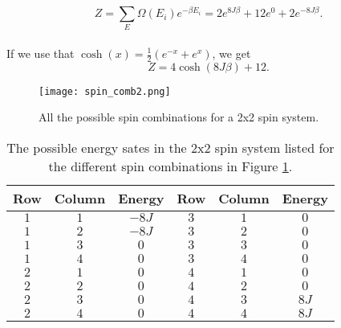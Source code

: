 \documentclass[12pt]{article}
\begin{document}
\begin{flushleft}
\vspace{5mm}
$$Z = \sum\limits_E \Omega(E_i)e^{-\beta E_i} = 2e^{8J\beta} + 12e^{0}+2e^{-8J\beta}.$$\\
\vspace{5mm}  
If we use that $\cosh(x) = \frac{1}{2}\left(e^{-x} + e^{x}\right)$, we get
\vspace{5mm}
\begin{equation}\label{eq:expr_Z}
Z = 4\cosh(8J\beta) + 12.
\end{equation}

\begin{figure}[!h]
\begin{center}
\texttt{[image: spin\_comb2.png]}
\caption{\label{fig:spin_comb}All the possible spin combinations for a 2x2 spin system.}
\end{center}
\end{figure}

\begin{table}[!h]
\begin{center}
\begin{tabular}{| c | c | c || c | c | c |}
	\hline
	\textbf{Row} & \textbf{Column} & \textbf{Energy} & \textbf{Row} & \textbf{Column} & \textbf{Energy}\\
	\hline	
	$1$ & $1$ & $-8J$ & $3$ & $1$ & $0$ \\
	$1$ & $2$ & $-8J$ & $3$ & $2$ & $0$ \\	
	$1$ & $3$ & $0$ & $3$ & $3$ & $0$ \\
	$1$ & $4$ & $0$ & $3$ & $4$ & $0$ \\
	$2$ & $1$ & $0$ & $4$ & $1$ & $0$ \\
	$2$ & $2$ & $0$ & $4$ & $2$ & $0$\\
	$2$ & $3$ & $0$ & $4$ & $3$ & $8J$\\
	$2$ & $4$ & $0$ & $4$ & $4$ & $8J$\\
  \hline
\end{tabular}
\end{center}
\caption{\label{tab:energy_states}The possible energy sates in the 2x2 spin system listed for the different spin combinations in Figure \ref{fig:spin_comb}.}
\end{table}
\newpage

\end{flushleft}
\end{document}
